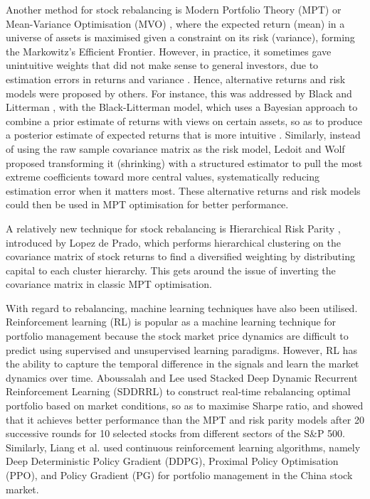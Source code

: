\documentclass{article}
\begin{document}
Another method for stock rebalancing is Modern Portfolio Theory (MPT) or Mean-Variance Optimisation (MVO) \cite{markowitz_1991}, where the expected return (mean) in a universe of assets is maximised given a constraint on its risk (variance), forming the Markowitz's Efficient Frontier. However, in practice, it sometimes gave unintuitive weights that did not make sense to general investors, due to estimation errors in returns and variance \cite{xu2008black}. Hence, alternative returns and risk models were proposed by others. For instance, this was addressed by Black and Litterman \cite{Black_1991}, with the Black-Litterman model, which uses a Bayesian approach to combine a prior estimate of returns with views on certain assets, so as to produce a posterior estimate of expected returns that is more intuitive \cite{Idzorek2004}. Similarly, instead of using the raw sample covariance matrix as the risk model, Ledoit and Wolf \cite{Ledoit2004, Ledoit2001} proposed transforming it (shrinking) with a structured estimator to pull the most extreme coefficients toward more central values, systematically reducing estimation error when it matters most. These alternative returns and risk models could then be used in MPT optimisation for better performance.

A relatively new technique for stock rebalancing is Hierarchical Risk Parity \cite{hrp}, introduced by Lopez de Prado, which performs hierarchical clustering on the covariance matrix of stock returns to find a diversified weighting by distributing capital to each cluster hierarchy. This gets around the issue of inverting the covariance matrix in classic MPT optimisation.

With regard to rebalancing, machine learning techniques have also been utilised. Reinforcement learning (RL) is popular as a machine learning technique for portfolio management because the stock market price dynamics are difficult to predict using supervised and unsupervised learning paradigms. However, RL has the ability to capture the temporal difference in the signals and learn the market dynamics over time. Aboussalah and Lee \cite{SDDRRL} used Stacked Deep Dynamic Recurrent Reinforcement Learning (SDDRRL) to construct real-time rebalancing optimal portfolio based on market conditions, so as to maximise Sharpe ratio, and showed that it achieves better performance than the MPT and risk parity models after 20 successive rounds for 10 selected stocks from different sectors of the S\&P 500. Similarly, Liang et al. \cite{liang2018adversarial} used continuous reinforcement learning algorithms, namely Deep Deterministic Policy Gradient (DDPG), Proximal Policy Optimisation (PPO), and Policy Gradient (PG) for portfolio management in the China stock market.
\end{document}
